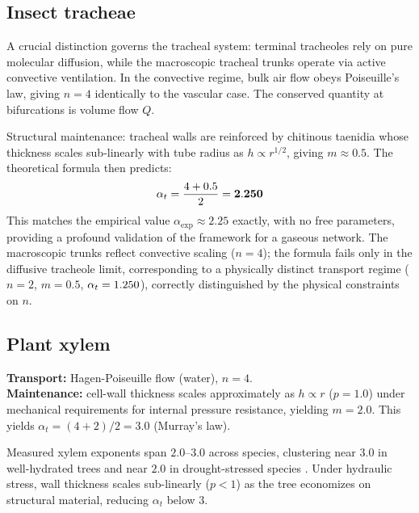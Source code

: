 \documentclass[11pt,a4paper]{article}
\theoremstyle{remark}
\begin{document}
\subsection{Insect tracheae}
A crucial distinction governs the tracheal system: terminal tracheoles rely on
pure molecular diffusion, while the macroscopic tracheal trunks operate via
active convective ventilation. In the convective regime, bulk air flow obeys
Poiseuille's law, giving $n=4$ identically to the vascular case. The conserved
quantity at bifurcations is volume flow $Q$.

Structural maintenance: tracheal walls are reinforced by chitinous taenidia
whose thickness scales sub-linearly with tube radius as $h \propto r^{1/2}$,
giving $m \approx 0.5$.
The theoretical formula then predicts:
\begin{equation*}
\alpha_t = \frac{4 + 0.5}{2} = \mathbf{2.250{}}
\end{equation*}
This matches the empirical value $\alpha_{\exp} \approx 2.25$ exactly, with no
free parameters, providing a profound validation of the framework for a gaseous
network. The macroscopic trunks reflect convective scaling ($n=4$); the formula
fails only in the diffusive tracheole limit, corresponding to a physically
distinct transport regime ($n=2$, $m=0.5$, $\alpha_t = 1.250{}$),
correctly distinguished by the physical constraints on $n$.

\subsection{Plant xylem}
\textbf{Transport:} Hagen-Poiseuille flow (water), $n=4$. \\
\textbf{Maintenance:} cell-wall thickness scales approximately as $h \propto r$ ($p = 1.0$)
under mechanical requirements for internal pressure resistance, yielding $m = 2.0$.
This yields $\alpha_t = (4+2)/2 = 3.0$ (Murray's law).

Measured xylem exponents span $2.0$--$3.0$ across species, clustering near $3.0$
in well-hydrated trees and near $2.0$ in drought-stressed species
\cite{mcculloh2003}. Under hydraulic stress, wall thickness scales sub-linearly
($p < 1$) as the tree economizes on structural material, reducing $\alpha_t$
below 3.
\end{document}
